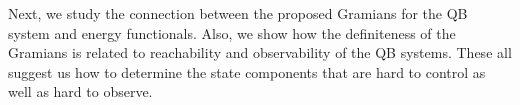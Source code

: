  Next, we study the connection between the proposed Gramians for the QB system  and energy functionals. Also, we show how the definiteness of the Gramians is related to reachability and observability of the QB systems. These all suggest us how to determine the state components that are hard to control as well as hard to observe.